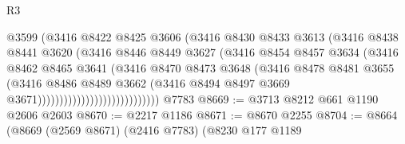 \begin{lexlean}{R3}
\begin{coremodule}
                                        @3599
                                        (@3416
                                          @8422
                                          @8425
                                          @3606
                                          (@3416
                                            @8430
                                            @8433
                                            @3613
                                            (@3416
                                              @8438
                                              @8441
                                              @3620
                                              (@3416
                                                @8446
                                                @8449
                                                @3627
                                                (@3416
                                                  @8454
                                                  @8457
                                                  @3634
                                                  (@3416
                                                    @8462
                                                    @8465
                                                    @3641
                                                    (@3416
                                                      @8470
                                                      @8473
                                                      @3648
                                                      (@3416
                                                        @8478
                                                        @8481
                                                        @3655
                                                        (@3416
                                                          @8486
                                                          @8489
                                                          @3662
                                                          (@3416
                                                            @8494
                                                            @8497
                                                            @3669
                                                            @3671))))))))))))))))))))))))))))
    @7783
@8669 := @3713 @8212 @661 @1190 @2606 @2603
@8670 := @2217 @1186
@8671 := @8670 @2255
@8704 := @8664
    (@8669
      (@2569 @8671)
      (@2416 @7783)
      (@8230
        @177
        @1189

\end{coremodule}
\end{lexlean}
